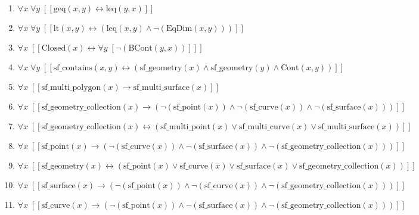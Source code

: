 \documentclass{article}
\begin{document}
\begin{enumerate}
\item $\forall x\; \forall y\;  \left[ \left[ \textrm{geq}(x,y) \leftrightarrow \textrm{leq}(y,x) \right] \right]$
\item $\forall x\; \forall y\;  \left[ \left[ \textrm{lt}(x,y) \leftrightarrow \left(\textrm{leq}(x,y) \land \neg \left(\textrm{EqDim}(x,y)\right)\right) \right] \right]$
\item $\forall x\;  \left[ \left[ \textrm{Closed}(x) \leftrightarrow \forall y\;  \left[ \neg \left(\textrm{BCont}(y,x)\right) \right] \right] \right]$
\item $\forall x\; \forall y\;  \left[ \left[ \textrm{sf\_contains}(x,y) \leftrightarrow \left(\textrm{sf\_geometry}(x) \land \textrm{sf\_geometry}(y) \land \textrm{Cont}(x,y)\right) \right] \right]$
\item $\forall x\;  \left[ \left[ \textrm{sf\_multi\_polygon}(x) \rightarrow \textrm{sf\_multi\_surface}(x) \right] \right]$
\item $\forall x\;  \left[ \left[ \textrm{sf\_geometry\_collection}(x) \rightarrow \left(\neg \left(\textrm{sf\_point}(x)\right) \land \neg \left(\textrm{sf\_curve}(x)\right) \land \neg \left(\textrm{sf\_surface}(x)\right)\right) \right] \right]$
\item $\forall x\;  \left[ \left[ \textrm{sf\_geometry\_collection}(x) \leftrightarrow \left(\textrm{sf\_multi\_point}(x) \lor \textrm{sf\_multi\_curve}(x) \lor \textrm{sf\_multi\_surface}(x)\right) \right] \right]$
\item $\forall x\;  \left[ \left[ \textrm{sf\_point}(x) \rightarrow \left(\neg \left(\textrm{sf\_curve}(x)\right) \land \neg \left(\textrm{sf\_surface}(x)\right) \land \neg \left(\textrm{sf\_geometry\_collection}(x)\right)\right) \right] \right]$
\item $\forall x\;  \left[ \left[ \textrm{sf\_geometry}(x) \leftrightarrow \left(\textrm{sf\_point}(x) \lor \textrm{sf\_curve}(x) \lor \textrm{sf\_surface}(x) \lor \textrm{sf\_geometry\_collection}(x)\right) \right] \right]$
\item $\forall x\;  \left[ \left[ \textrm{sf\_surface}(x) \rightarrow \left(\neg \left(\textrm{sf\_point}(x)\right) \land \neg \left(\textrm{sf\_curve}(x)\right) \land \neg \left(\textrm{sf\_geometry\_collection}(x)\right)\right) \right] \right]$
\item $\forall x\;  \left[ \left[ \textrm{sf\_curve}(x) \rightarrow \left(\neg \left(\textrm{sf\_point}(x)\right) \land \neg \left(\textrm{sf\_surface}(x)\right) \land \neg \left(\textrm{sf\_geometry\_collection}(x)\right)\right) \right] \right]$

\end{enumerate}
\end{document}
